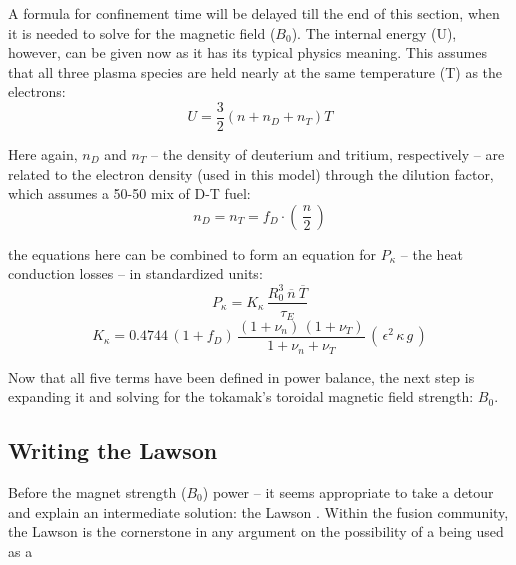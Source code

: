 A formula for confinement time will be delayed till the end of this section, when it is needed to solve for the magnetic field ($B_0$). The internal energy (U), however, can be given now as it has its typical physics meaning. This assumes that all three plasma species are held nearly at the same temperature (T) as the electrons:
\begin{equation}
	U = \frac{3}{2} \left( n + n_D + n_T \right) T
\end{equation}

Here again, $n_D$ and $n_T$ -- the density of deuterium and tritium, respectively -- are related to the electron density (used in this model) through the dilution factor, which assumes a 50-50 mix of D-T fuel:
\begin{equation}
	n_D = n_T = f_D \cdot \left( \, \frac{n}{2} \, \right)
\end{equation}

 the equations here can be combined to form an equation for $P_\kappa$ -- the heat conduction losses -- in standardized units:
\begin{equation}
	\label{eq:pkappa}
	P_\kappa = K_\kappa \, \frac{ R_0 ^ 3 \ \overline{n}  \ \overline{T}  }{\tau_E} 
\end{equation}
\begin{equation}
	K_\kappa = 0.4744 \, ( 1 + f_D ) \, \frac{ (1 + \nu_n) \, (1 + \nu_T) }{1 + \nu_n + \nu_T } \, ( \, \epsilon^2 \, \kappa \, g \, )
\end{equation}

Now that all five terms have been defined in power balance, the next step is expanding it and solving for the tokamak's toroidal magnetic field strength: $B_0$.

\subsection{Writing the Lawson }

Before  the magnet strength ($B_0$)  power  -- it seems appropriate to take a detour and explain an intermediate solution: the Lawson . Within the fusion community, the Lawson  is the cornerstone in any argument on the possibility of a  being used as a 

